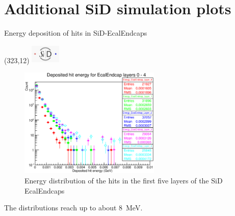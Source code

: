 \documentclass[xcolor={dvipsnames}]{beamer}
\newcommand{\sidlogo}{
  \setlength{\TPHorizModule}{1pt}
  \setlength{\TPVertModule}{1pt}
  \begin{textblock}{1}(323,12)
   \includegraphics[width=40pt,height=26pt]{figures/SiD.jpeg}
  \end{textblock}
  }
\begin{document}
\section{Additional SiD simulation plots}
\begin{frame}{Energy deposition of hits in SiD-EcalEndcaps}
\sidlogo
 \begin{figure}
 \centering
  \includegraphics[width=0.6\textwidth]{figures/sidloi3_pairs_1312_EcalEndcap_Hits_EcalEndcap_Energy_EcalEndcap_Layer_0-4.eps}
 \caption{Energy distribution of the hits in the first five layers of the SiD EcalEndcaps}
 \end{figure}
The distributions reach up to about \SI{8}{\mega\electronvolt}.
\end{frame}
\end{document}
